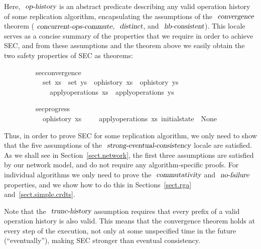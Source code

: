 \vspace{0.25em}
\noindent Here, $\isa{op-history}$ is an abstract predicate describing any valid operation history of some replication algorithm, encapsulating the assumptions of the $\isa{convergence}$ theorem ($\isa{concurrent-ops-commute}$, $\isa{distinct}$, and $\isa{hb-consistent}$).
This locale serves as a concise summary of the properties that we require in order to achieve SEC, and from these assumptions and the theorem above we easily obtain the two safety properties of SEC as theorems:
\vspace{0.25em}
\begin{isabellebody}
\ \ \ \ \ \ \ \ \ sec{\isacharunderscore}convergence{\isacharcolon}\isanewline
\ \ \ \ \ \ \ \ \ \ \ {\isachardoublequoteopen}set\ xs\ {\isacharequal}\ set\ ys{\isachardoublequoteclose}\ \ {\isachardoublequoteopen}op{\isacharunderscore}history\ xs{\isachardoublequoteclose}\ \ {\isachardoublequoteopen}op{\isacharunderscore}history\ ys{\isachardoublequoteclose}\isanewline
\ \ \ \ \ \ \ \ \ \ \ \ \ {\isachardoublequoteopen}apply{\isacharunderscore}operations\ xs\ {\isacharequal}\ apply{\isacharunderscore}operations\ ys{\isachardoublequoteclose}
\end{isabellebody}
\vspace{0.25em}
\begin{isabellebody}
\ \ \ \ \ \ \ \ \ sec{\isacharunderscore}progress{\isacharcolon}\isanewline
\ \ \ \ \ \ \ \ \ \ \ {\isachardoublequoteopen}op{\isacharunderscore}history\ xs{\isachardoublequoteclose}\ \ \ \ \ {\isachardoublequoteopen}apply{\isacharunderscore}operations\ xs\ initial{\isacharunderscore}state\ {\isasymnoteq}\ None{\isachardoublequoteclose}
\end{isabellebody}
\vspace{0.25em}

Thus, in order to prove SEC for some replication algorithm, we only need to show that the five assumptions of the $\isa{strong-eventual-consistency}$ locale are satisfied.
As we shall see in Section~\ref{sect.network}, the first three assumptions are satisfied by our network model, and do not require any algorithm-specific proofs.
For individual algorithms we only need to prove the $\isa{commutativity}$ and $\isa{no-failure}$ properties, and we show how to do this in Sections~\ref{sect.rga} and~\ref{sect.simple.crdts}.

Note that the $\isa{trunc-history}$ assumption requires that every prefix of a valid operation history is also valid.
This means that the convergence theorem holds at every step of the execution, not only at some unspecified time in the future (``eventually''), making SEC stronger than eventual consistency.

